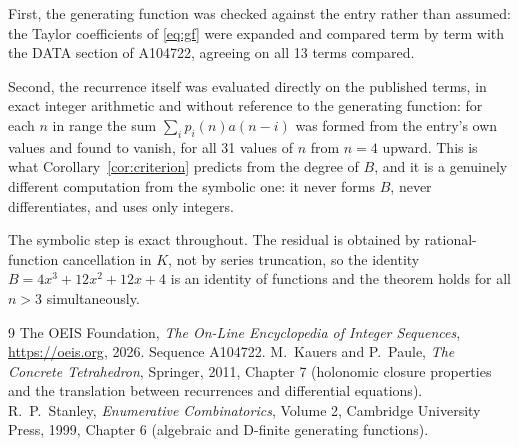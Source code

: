 \documentclass[11pt,a4paper]{article}
\theoremstyle{plain}
\theoremstyle{definition}
\begin{document}
First, the generating function was checked against the entry rather than assumed: the
Taylor coefficients of \eqref{eq:gf} were expanded and compared term by term with the DATA
section of A104722, agreeing on all 13 terms compared.

Second, the recurrence itself was evaluated directly on the published terms, in exact
integer arithmetic and without reference to the generating function: for each $n$ in range
the sum $\sum_{i}p_{i}(n)a(n-i)$ was formed from the entry's own values and found to
vanish, for all 31 values of $n$ from $n=4$ upward. This is what
Corollary~\ref{cor:criterion} predicts from the degree of $B$, and it is a genuinely
different computation from the symbolic one: it never forms $B$, never differentiates, and
uses only integers.

The symbolic step is exact throughout. The residual is obtained by rational-function
cancellation in $K$, not by series truncation, so the identity $B=4 x^{3} + 12 x^{2} + 12 x + 4$ is an
identity of functions and the theorem holds for all $n>3$ simultaneously.

\begin{thebibliography}{9}
 The OEIS Foundation, \emph{The On-Line Encyclopedia of Integer Sequences},
\url{https://oeis.org}, 2026. Sequence A104722.
 M.~Kauers and P.~Paule, \emph{The Concrete Tetrahedron}, Springer, 2011,
Chapter 7 (holonomic closure properties and the translation between recurrences and
differential equations).
 R.~P.~Stanley, \emph{Enumerative Combinatorics}, Volume 2, Cambridge
University Press, 1999, Chapter 6 (algebraic and D-finite generating functions).
\end{thebibliography}
\end{document}
